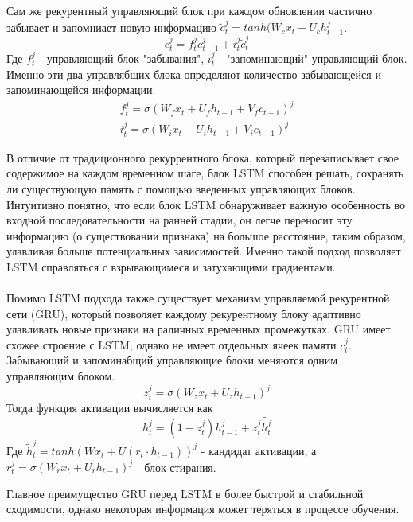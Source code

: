 \documentclass[12pt, a4paper]{article} %
\begin{document}
Сам же рекурентный управляющий блок при каждом обновлении частично забывает и запомниает новую информацию $\tilde{c}^j_t = tanh(W_c x_t + U_c h_{t-1}^j$.
\begin{equation}
    c_t^j = f_t^j c_{t-1}^j + i_t^j \tilde{c}_t^j
\end{equation}
Где $f_t^j$ - управляющий блок "забывания", $i_t^j$ - "запоминающий" управляющий блок. Именно эти два управлябщих блока определяют количество забывающейся и запоминающейся информации.\\
\begin{equation}
    \begin{aligned}
        f_t^j = \sigma(W_f x_t + U_f h_{t-1} + V_f c_{t-1})^j \\
        i_t^j = \sigma(W_i x_t + U_i h_{t-1} + V_i c_{t-1})^j
    \end{aligned}
\end{equation}

В отличие от традиционного рекуррентного блока, который перезаписывает свое содержимое на каждом временном шаге, блок LSTM способен решать, сохранять ли существующую память с помощью введенных управляющих блоков.
Интуитивно понятно, что если блок LSTM обнаруживает важную особенность во входной последовательности на ранней стадии, он легче переносит эту информацию (о существовании признака) на большое расстояние, таким образом, улавливая больше потенциальных зависимостей.
Именно такой подход позволяет LSTM справляться с взрывающимеся и затухающими градиентами.\\
\\
Помимо LSTM подхода также существует механизм управляемой рекурентной сети (GRU), который позволяет каждому рекурентному блоку адаптивно улавливать новые признаки на раличных временных промежутках. GRU имеет схожее строение с LSTM, однако не имеет отдельных ячеек памяти $c_t^j$. Забывающий и запоминабщий управляющие блоки меняются одним управляющим блоком.
\begin{equation}
    z_t^j = \sigma(W_z x_t + U_z h_{t-1})^j
\end{equation}
Тогда функция активации вычисляется как
\begin{equation}
    h_t^j = (1-z_t^j)h_{t-1}^j + z_t^j \tilde{h_t^j}
\end{equation}
Где $\tilde{h}_t^j = tanh(Wx_t + U(r_t \cdot h_{t-1}))^j$ - кандидат активации, а $r_t^j=\sigma(W_r x_t + U_r h_{t-1})^j$ - блок стирания.

Главное преимущество GRU перед LSTM в более быстрой и стабильной сходимости, однако некоторая информация может теряться в процессе обучения.\\
\end{document}
